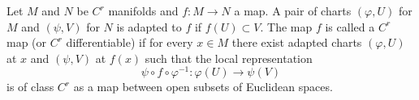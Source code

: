 Let $M$ and $N$ be $C^r$ manifolds and $f: M \to N$ a map. A pair of charts $(\varphi, U)$ for $M$ and $(\psi, V)$ for $N$ is adapted to $f$ if $f(U) \subset V$. The map $f$ is called a $C^r$ map (or $C^r$ differentiable) if for every $x \in M$ there exist adapted charts $(\varphi, U)$ at $x$ and $(\psi, V)$ at $f(x)$ such that the local representation
$$\psi \circ f \circ \varphi^{-1}: \varphi(U) \to \psi(V)$$
is of class $C^r$ as a map between open subsets of Euclidean spaces.
